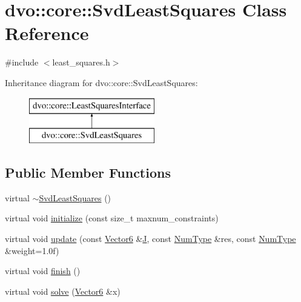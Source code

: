 \hypertarget{classdvo_1_1core_1_1_svd_least_squares}{}\section{dvo\+:\+:core\+:\+:Svd\+Least\+Squares Class Reference}
\label{classdvo_1_1core_1_1_svd_least_squares}


{\ttfamily \#include $<$least\+\_\+squares.\+h$>$}

Inheritance diagram for dvo\+:\+:core\+:\+:Svd\+Least\+Squares\+:\begin{figure}[H]
\begin{center}
\leavevmode
\includegraphics[height=2.000000cm]{classdvo_1_1core_1_1_svd_least_squares}
\end{center}
\end{figure}
\subsection*{Public Member Functions}
\begin{DoxyCompactItemize}
\item 
virtual \mbox{\hyperlink{classdvo_1_1core_1_1_svd_least_squares_ae60699467df2eca3f9e8cc7814388d9f}{$\sim$\+Svd\+Least\+Squares}} ()
\item 
virtual void \mbox{\hyperlink{classdvo_1_1core_1_1_svd_least_squares_aa09756d97cb63e8dc8276a88a1a07791}{initialize}} (const size\+\_\+t maxnum\+\_\+constraints)
\item 
virtual void \mbox{\hyperlink{classdvo_1_1core_1_1_svd_least_squares_ae9d28bc58804d7e43cf461ca092b9563}{update}} (const \mbox{\hyperlink{namespacedvo_1_1core_a05327f3312d32a301bce9fccda9e5807}{Vector6}} \&\mbox{\hyperlink{classdvo_1_1core_1_1_svd_least_squares_a8c0eaffdf1517bb11cb3fe7425e3274e}{J}}, const \mbox{\hyperlink{namespacedvo_1_1core_ab9c199d221775a923e2549ad7e15c323}{Num\+Type}} \&res, const \mbox{\hyperlink{namespacedvo_1_1core_ab9c199d221775a923e2549ad7e15c323}{Num\+Type}} \&weight=1.\+0f)
\item 
virtual void \mbox{\hyperlink{classdvo_1_1core_1_1_svd_least_squares_ac91cb5c82af6eb9d91d3ef4e85dc76a3}{finish}} ()
\item 
virtual void \mbox{\hyperlink{classdvo_1_1core_1_1_svd_least_squares_ae0124d7c24b90b1101bf38da59f789aa}{solve}} (\mbox{\hyperlink{namespacedvo_1_1core_a05327f3312d32a301bce9fccda9e5807}{Vector6}} \&x)
\end{DoxyCompactItemize}
